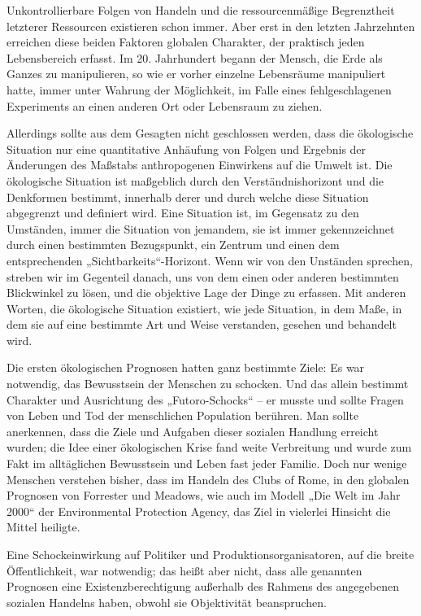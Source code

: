 \documentclass[11pt,a4paper]{article}
\begin{document}
Unkontrollierbare Folgen von Handeln und die ressourcenmäßige Begrenztheit
letzterer Ressourcen existieren schon immer. Aber erst in den letzten
Jahrzehnten erreichen diese beiden Faktoren globalen Charakter, der praktisch
jeden Lebensbereich erfasst.  Im 20. Jahrhundert begann der Mensch, die Erde
als Ganzes zu manipulieren, so wie er vorher einzelne Lebensräume manipuliert
hatte, immer unter Wahrung der Möglichkeit, im Falle eines fehlgeschlagenen
Experiments an einen anderen Ort oder Lebensraum zu ziehen.

Allerdings sollte aus dem Gesagten nicht geschlossen werden, dass die
ökologische Situation nur eine quantitative Anhäufung von Folgen und Ergebnis
der Änderungen des Maßstabs anthropogenen Einwirkens auf die Umwelt ist. Die
ökologische Situation ist maßgeblich durch den Verständnishorizont und die
Denkformen bestimmt, innerhalb derer und durch welche diese Situation
abgegrenzt und definiert wird. Eine Situation ist, im Gegensatz zu den
Umständen, immer die Situation von jemandem, sie ist immer gekennzeichnet
durch einen bestimmten Bezugspunkt, ein Zentrum und einen dem entsprechenden
„Sichtbarkeits“-Horizont. Wenn wir von den Unständen sprechen, streben wir im
Gegenteil danach, uns von dem einen oder anderen bestimmten Blickwinkel zu
lösen, und die objektive Lage der Dinge zu erfassen.  Mit anderen Worten, die
ökologische Situation existiert, wie jede Situation, in dem Maße, in dem sie
auf eine bestimmte Art und Weise verstanden, gesehen und behandelt wird.

Die ersten ökologischen Prognosen hatten ganz bestimmte Ziele: Es war
notwendig, das Bewusstsein der Menschen zu schocken. Und das allein bestimmt
Charakter und Ausrichtung des „Futoro-Schocks“ -- er musste und sollte Fragen
von Leben und Tod der menschlichen Population berühren.  Man sollte
anerkennen, dass die Ziele und Aufgaben dieser sozialen Handlung erreicht
wurden; die Idee einer ökologischen Krise fand weite Verbreitung und wurde zum
Fakt im alltäglichen Bewusstsein und Leben fast jeder Familie. Doch nur wenige
Menschen verstehen bisher, dass im Handeln des Clubs of Rome, in den globalen
Prognosen von Forrester und Meadows, wie auch im Modell „Die Welt im Jahr
2000“ der Environmental Protection Agency, das Ziel in vielerlei Hinsicht die
Mittel heiligte.

Eine Schockeinwirkung auf Politiker und Produktionsorganisatoren, auf die
breite Öffentlich\-keit, war notwendig; das heißt aber nicht, dass alle
genannten Prognosen eine Existenzberechtigung außerhalb des Rahmens des
angegebenen sozialen Handelns haben, obwohl sie Objektivität beanspruchen.
\end{document}
